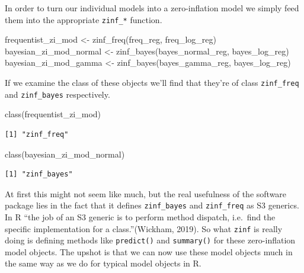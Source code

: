 \documentclass[12pt,twoside]{reedthesis}
\newenvironment{Shaded}{\begin{snugshade}}{\end{snugshade}}
\newcommand{\FunctionTok}[1]{\textcolor[rgb]{0.00,0.00,0.00}{#1}}
\newcommand{\NormalTok}[1]{#1}
\newcommand{\OtherTok}[1]{\textcolor[rgb]{0.56,0.35,0.01}{#1}}
\begin{document}
In order to turn our individual models into a zero-inflation model we simply feed them into the appropriate \texttt{zinf\_*} function.
\begin{Shaded}
\begin{Highlighting}[]
\NormalTok{frequentist\_zi\_mod }\OtherTok{\textless{}{-}} \FunctionTok{zinf\_freq}\NormalTok{(freq\_reg, freq\_log\_reg)}
\NormalTok{bayesian\_zi\_mod\_normal }\OtherTok{\textless{}{-}} \FunctionTok{zinf\_bayes}\NormalTok{(bayes\_normal\_reg, bayes\_log\_reg)}
\NormalTok{bayesian\_zi\_mod\_gamma }\OtherTok{\textless{}{-}} \FunctionTok{zinf\_bayes}\NormalTok{(bayes\_gamma\_reg, bayes\_log\_reg)}
\end{Highlighting}
\end{Shaded}
If we examine the class of these objects we'll find that they're of class \texttt{zinf\_freq} and \texttt{zinf\_bayes} respectively.
\begin{Shaded}
\begin{Highlighting}[]
\FunctionTok{class}\NormalTok{(frequentist\_zi\_mod)}
\end{Highlighting}
\end{Shaded}
\begin{verbatim}
[1] "zinf_freq"
\end{verbatim}
\begin{Shaded}
\begin{Highlighting}[]
\FunctionTok{class}\NormalTok{(bayesian\_zi\_mod\_normal)}
\end{Highlighting}
\end{Shaded}
\begin{verbatim}
[1] "zinf_bayes"
\end{verbatim}
At first this might not seem like much, but the real usefulness of the software package lies in the fact that it defines \texttt{zinf\_bayes} and \texttt{zinf\_freq} as S3 generics. In R ``the job of an S3 generic is to perform method dispatch, i.e.~find the specific implementation for a class.''(Wickham, 2019). So what \texttt{zinf} is really doing is defining methods like \texttt{predict()} and \texttt{summary()} for these zero-inflation model objects. The upshot is that we can now use these model objects much in the same way as we do for typical model objects in R.
\end{document}
